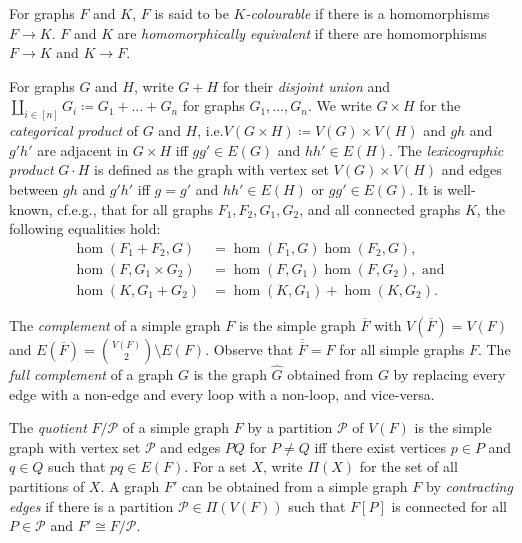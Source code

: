 \documentclass[3p,final]{elsarticle}
\begin{document}
	For graphs $F$ and $K$, $F$ is said to be \emph{$K$-colourable} if there is a homomorphisms $F \to K$. $F$ and $K$ are \emph{homomorphically equivalent} if there are homomorphisms $F \to K$ and $K \to F$.
	
	For graphs $G$ and $H$, write $G + H$ for their \emph{disjoint union} and $\coprod_{i \in [n]} G_i \coloneqq G_1 + \dots + G_n$ for graphs $G_1, \dots, G_n$.
	We write $G \times H$ for the \emph{categorical product} of $G$ and $H$, i.e.\@ $V(G \times H) \coloneqq V(G) \times V(H)$ and $gh$ and $g'h'$ are adjacent in $G \times H$ iff $gg' \in E(G)$ and $hh' \in E(H)$. The \emph{lexicographic product} $G \cdot H$ is defined as the graph with vertex set $V(G) \times V(H)$ and edges between $gh$ and $g'h'$ iff $g = g'$ and $hh' \in E(H)$ or $gg' \in E(G)$. It is well-known, cf.\@ e.g.\@ \cite[(5.28)--(5.30)]{lovasz_large_2012}, that
	for all graphs $F_1, F_2, G_1, G_2$, and all connected graphs $K$, the following equalities hold:
	\begin{align}
		\hom(F_1 + F_2, G) &= \hom(F_1, G) \hom(F_2, G), \label{eq:coproduct} \\
		\hom(F, G_1 \times G_2) &= \hom(F, G_1) \hom(F, G_2), \text{ and }\label{eq:product} \\
		\hom(K, G_1 + G_2) &= \hom(K, G_1) + \hom(K, G_2). \label{eq:disjoint}
	\end{align}
		
	The \emph{complement} of a simple graph $F$ is the simple graph $\overline{F}$ with $V(\overline{F}) = V(F)$ and $E(\overline{F}) = \binom{V(F)}{2} \setminus E(F)$.
	Observe that $\overline{\overline{F}} = F$ for all simple graphs $F$.
	The \emph{full complement} of a  graph $G$ is the graph $\widehat{G}$ obtained from $G$ by replacing every edge with a non-edge and every loop with a non-loop, and vice-versa.
	
	The \emph{quotient} $F/\mathcal{P}$ of a simple graph $F$ by a partition $\mathcal{P}$ of $V(F)$ is the simple graph with vertex set $\mathcal{P}$ and edges $PQ$ for $P \neq Q$ iff there exist vertices $p \in P$ and $q \in Q$ such that $pq \in E(F)$. 
	For a set $X$, write $\Pi(X)$ for the set of all partitions of $X$.	
	A graph $F'$ can be obtained from a simple graph $F$ by \emph{contracting edges} if there is a partition $\mathcal{P} \in \Pi(V(F))$ such that $F[P]$ is connected for all $P \in \mathcal{P}$ and $F' \cong F/\mathcal{P}$.
	
\end{document}
